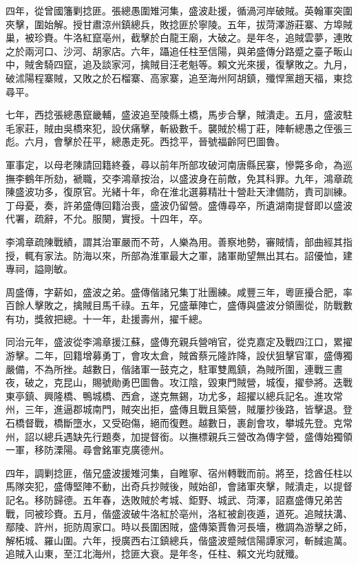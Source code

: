 \begin{pinyinscope}
四年，從曾國籓剿捻匪。張總愚圍雉河集，盛波赴援，循渦河岸破賊。英翰軍突圍夾擊，圍始解。授甘肅涼州鎮總兵，敗捻匪於寧陵。五年，拔菏澤游莊寨、方埠賊巢，被珍賚。牛洛紅竄亳州，截擊於白龍王廟，大破之。是年冬，追賊雲夢，連敗之於兩河口、沙河、胡家店。六年，躡追任柱至信陽，與弟盛傳分路蹙之臺子畈山中，賊舍騎四竄，追及談家河，擒賊目汪老魁等。賴文光來援，復擊敗之。九月，破沭陽程寨賊，又敗之於石榴寨、高家寨，追至海州阿胡鎮，殲悍黨趙天福，東捻尋平。

七年，西捻張總愚竄畿輔，盛波追至陵縣土橋，馬步合擊，賊潰走。五月，盛波駐毛家莊，賊由吳橋來犯，設伏痛擊，斬級數千。襲賊於楊丁莊，陣斬總愚之侄張三彪。六月，會擊於茌平，總愚走死。西捻平，晉號福齡阿巴圖魯。

軍事定，以母老陳請回籍終養，尋以前年所部攻破河南唐縣民寨，慘斃多命，為巡撫李鶴年所劾，褫職，交李鴻章按治，以盛波身在前敵，免其科罪。九年，鴻章疏陳盛波功多，復原官。光緒十年，命在淮北選募精壯十營赴天津備防，責司訓練。丁母憂，奏，許弟盛傳回籍治喪，盛波仍留營。盛傳尋卒，所遺湖南提督即以盛波代署，疏辭，不允。服闋，實授。十四年，卒。

李鴻章疏陳戰績，謂其治軍嚴而不苛，人樂為用。善察地勢，審賊情，部曲經其指授，輒有家法。防海以來，所部為淮軍最大之軍，諸軍勛望無出其右。詔優恤，建專祠，謚剛敏。

周盛傳，字薪如，盛波之弟。盛傳偕諸兄集丁壯團練。咸豐三年，粵匪擾合肥，率百餘人擊敗之，擒賊目馬千祿。五年，兄盛華陣亡，盛傳與盛波分領團從，防戰數有功，獎敘把總。十一年，赴援壽州，擢千總。

同治元年，盛波從李鴻章援江蘇，盛傳充親兵營哨官，從克嘉定及戰四江口，累擢游擊。二年，回籍增募勇丁，會攻太倉，賊酋蔡元隆詐降，設伏狙擊官軍，盛傳獨嚴備，不為所挫。越數日，偕諸軍一鼓克之，駐軍雙鳳鎮，為賊所圍，連戰三晝夜，破之，克昆山，賜號勛勇巴圖魯。攻江陰，毀東門賊營，城復，擢參將。迭戰東亭鎮、興隆橋、鴨城橋、西倉，遂克無錫，功尤多，超擢以總兵記名。進攻常州，三年，進逼郡城南門，賊突出拒，盛傳且戰且築營，賊屢抄後路，皆擊退。登石橋督戰，橋斷墮水，又受砲傷，絕而復甦。越數日，裹創會攻，攀城先登。克常州，詔以總兵遇缺先行題奏，加提督銜。以撫標親兵三營改為傳字營，盛傳始獨領一軍，移防溧陽。尋會銘軍克廣德州。

四年，調剿捻匪，偕兄盛波援雉河集，自睢寧、宿州轉戰而前。將至，捻酋任柱以馬隊突犯，盛傳堅陣不動，出奇兵抄賊後，賊始卻，會諸軍夾擊，賊潰走，以提督記名。移防歸德。五年春，迭敗賊於考城、鉅野、城武、菏澤，詔嘉盛傳兄弟苦戰，同被珍賚。五月，偕盛波破牛洛紅於亳州，洛紅被創夜遁，道死。追賊扶溝、鄢陵、許州，扼防周家口。時以長圍困賊，盛傳築賈魯河長墻，檄調為游擊之師，解柘城、羅山圍。六年，授廣西右江鎮總兵，偕盛波蹙賊信陽譚家河，斬馘逾萬。追賊入山東，至江北海州，捻匪大衰。是年冬，任柱、賴文光均就殲。


\end{pinyinscope}
